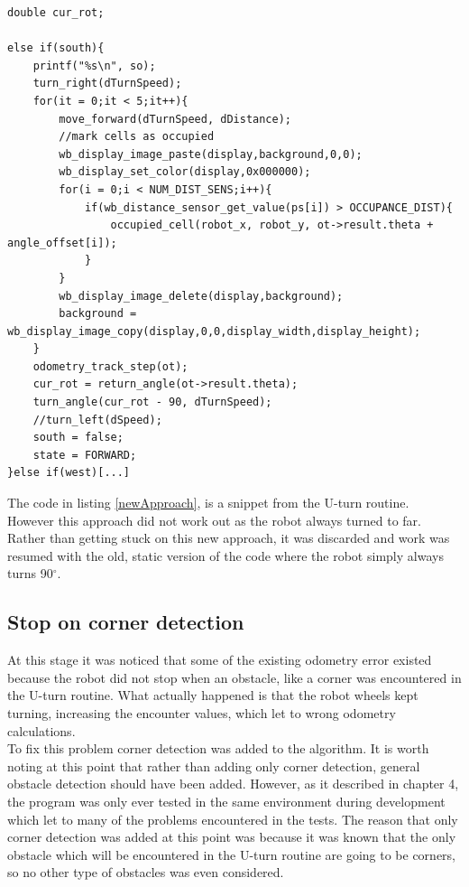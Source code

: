 \begin{lstlisting}[caption={Code snippet of the new approach}, label={newApproach}]
double cur_rot;
    
else if(south){
    printf("%s\n", so);
    turn_right(dTurnSpeed);
    for(it = 0;it < 5;it++){
        move_forward(dTurnSpeed, dDistance);
        //mark cells as occupied
        wb_display_image_paste(display,background,0,0);
        wb_display_set_color(display,0x000000);
        for(i = 0;i < NUM_DIST_SENS;i++){
            if(wb_distance_sensor_get_value(ps[i]) > OCCUPANCE_DIST){
                occupied_cell(robot_x, robot_y, ot->result.theta + angle_offset[i]);
            }
        }
        wb_display_image_delete(display,background);
        background = wb_display_image_copy(display,0,0,display_width,display_height);
    }
    odometry_track_step(ot);
    cur_rot = return_angle(ot->result.theta);
    turn_angle(cur_rot - 90, dTurnSpeed);
    //turn_left(dSpeed);
    south = false;
    state = FORWARD;
}else if(west)[...]
\end{lstlisting}

The code in listing \ref{newApproach}, is a snippet from the U-turn routine. \\
However this approach did not work out as the robot always turned to far. Rather than getting stuck on this new approach, it was discarded and work was resumed with the old, static version of the code where the robot simply always turns 90$^{\circ}$. \\

\subsection{Stop on corner detection}
At this stage it was noticed that some of the existing odometry error existed because the robot did not stop when an obstacle, like a corner was encountered in the U-turn routine.
What actually happened is that the robot wheels kept turning, increasing the encounter values, which let to wrong odometry calculations. \\
To fix this problem corner detection was added to the algorithm.
It is worth noting at this point that rather than adding only corner detection, general obstacle detection should have been added. However, as it described in chapter 4, the program was only ever tested in the same environment during development which let to many of the problems encountered in the tests.
The reason that only corner detection was added at this point was because it was known that the only obstacle which will be encountered in the U-turn routine are going to be corners, so no other type of obstacles was even considered.\\[3ex]

